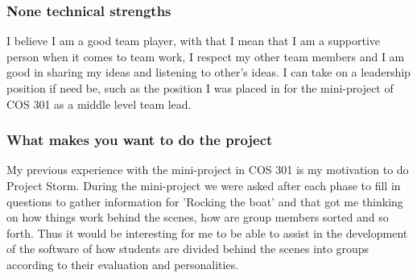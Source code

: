 \documentclass[hidelinks, 12pt, oneside]{article}
\begin{document}
\subsubsection{None technical strengths}
I believe I am a good team player, with that I mean that I am a supportive
person when it comes to team work, I respect my other team members and
I am good in sharing my ideas and listening to other's ideas. I can take on
a leadership position if need be, such as the position I was placed in for the
mini-project of COS 301 as a middle level team lead.

\subsubsection{What makes you want to do the project}
My previous experience with the mini-project in COS 301 is my motivation to do Project Storm. During the mini-project we were asked after each phase to fill in questions to gather information for 'Rocking the boat' and that got me thinking on how things work behind the scenes, how are group members sorted and so forth. Thus it would be interesting for me to be able to assist in the development of the software of how students are divided behind the scenes into groups according to their evaluation and personalities. 
\end{document}
